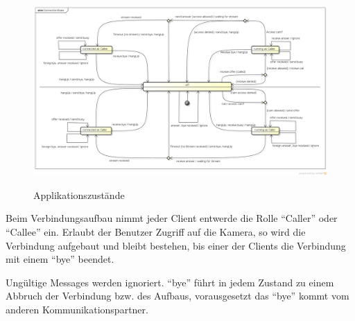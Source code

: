 	
	\begin{landscape}		
		\begin{figure}[H]
			\centering
			\includegraphics[height=0.7\textwidth]{../architekturanalayse/img/connectionState.png}
			\label{img:deployment}
			\caption{Applikationszustände}
		\end{figure}
		Beim Verbindungsaufbau nimmt jeder Client entwerde die Rolle "`Caller"' oder
		"`Callee"' ein. Erlaubt der Benutzer Zugriff auf die Kamera, so wird die
		Verbindung aufgebaut und bleibt bestehen, bis einer der Clients die Verbindung mit einem "`bye"' beendet.
		
		Ungültige Messages werden ignoriert. "`bye"' führt in jedem Zustand zu einem
		Abbruch der Verbindung bzw. des Aufbaus, vorausgesetzt das "`bye"'
		kommt vom anderen Kommunikationspartner.
	\end{landscape}
	